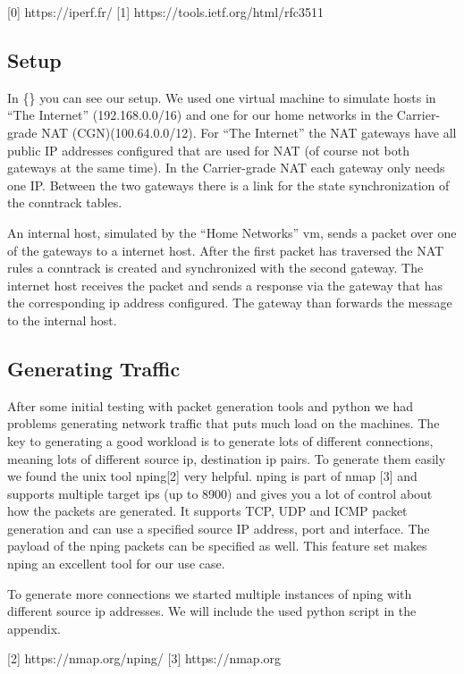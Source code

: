 {[}0{]} https://iperf.fr/ {[}1{]} https://tools.ietf.org/html/rfc3511

\subsection{Setup}\label{setup-1}

In \{\} you can see our setup. We used one virtual machine to simulate
hosts in ``The Internet'' (192.168.0.0/16) and one for our home networks
in the Carrier-grade NAT (CGN)(100.64.0.0/12). For ``The Internet'' the
NAT gateways have all public IP addresses configured that are used for
NAT (of course not both gateways at the same time). In the Carrier-grade
NAT each gateway only needs one IP. Between the two gateways there is a
link for the state synchronization of the conntrack tables.

An internal host, simulated by the ``Home Networks'' vm, sends a packet
over one of the gateways to a internet host. After the first packet has
traversed the NAT rules a conntrack is created and synchronized with the
second gateway. The internet host receives the packet and sends a
response via the gateway that has the corresponding ip address
configured. The gateway than forwards the message to the internal host.

\subsection{Generating Traffic}\label{generating-traffic}

After some initial testing with packet generation tools and python we
had problems generating network traffic that puts much load on the
machines. The key to generating a good workload is to generate lots of
different connections, meaning lots of different source ip, destination
ip pairs. To generate them easily we found the unix tool nping{[}2{]}
very helpful. nping is part of nmap {[}3{]} and supports multiple target
ips (up to 8900) and gives you a lot of control about how the packets
are generated. It supports TCP, UDP and ICMP packet generation and can
use a specified source IP address, port and interface. The payload of
the nping packets can be specified as well. This feature set makes nping
an excellent tool for our use case.

To generate more connections we started multiple instances of nping with
different source ip addresses. We will include the used python script in
the appendix.

{[}2{]} https://nmap.org/nping/ {[}3{]} https://nmap.org

